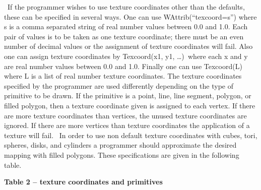 \documentclass[letterpaper]{article}
\begin{document}
{
\ If the programmer wishes to use texture coordinates other than the defaults, these can be specified in several ways.
One can use \textsf{WAttrib(``texcoord=s'')} where \textsf{s} is a comma separated string of real number values between
\textsf{0.0} and \textsf{1.0}. Each pair of values is to be taken as one texture coordinate; there must be an even
number of decimal values or the assignment of texture coordinates will fail. Also one can assign texture coordinates by
\textsf{Texcoord(x1, y1, {\dots})}\texttt{ }where each \textsf{x} and \textsf{y} are real number values between
\textsf{0.0} and \textsf{1.0}. Finally one can use \textsf{Texcoord(L)} where \textsf{L} is a list of real number
texture coordinates. The texture coordinates specified by the programmer are used differently depending on the type of
primitive to be drawn. If the primitive is a point, line, line segment, polygon, or filled polygon, then a texture
coordinate given is assigned to each vertex. If there are more texture coordinates than vertices, the unused texture
coordinates are ignored. If there are more vertices than texture coordinates the application of a texture will fail.
\ In order to use non default texture coordinates with cubes, tori, spheres, disks, and cylinders a programmer should
approximate the desired mapping with filled polygons. These specifications are given in the following table. }

\pagebreak

{\centering{}\bfseries
Table 2 -- texture coordinates and primitives
\par}
\end{document}
